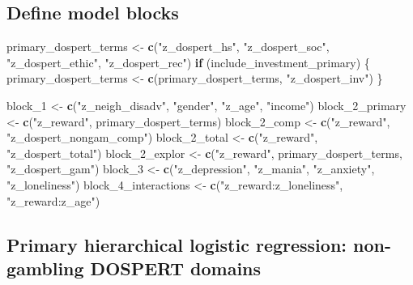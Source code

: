 \documentclass[
]{article}
\newenvironment{Shaded}{\begin{snugshade}}{\end{snugshade}}
\newcommand{\ControlFlowTok}[1]{\textcolor[rgb]{0.13,0.29,0.53}{\textbf{#1}}}
\newcommand{\FunctionTok}[1]{\textcolor[rgb]{0.13,0.29,0.53}{\textbf{#1}}}
\newcommand{\NormalTok}[1]{#1}
\newcommand{\OtherTok}[1]{\textcolor[rgb]{0.56,0.35,0.01}{#1}}
\newcommand{\StringTok}[1]{\textcolor[rgb]{0.31,0.60,0.02}{#1}}
\begin{document}
\subsection{Define model blocks}\label{define-model-blocks}

\begin{Shaded}
\begin{Highlighting}[]
\NormalTok{primary\_dospert\_terms }\OtherTok{\textless{}{-}} \FunctionTok{c}\NormalTok{(}\StringTok{"z\_dospert\_hs"}\NormalTok{, }\StringTok{"z\_dospert\_soc"}\NormalTok{, }\StringTok{"z\_dospert\_ethic"}\NormalTok{, }\StringTok{"z\_dospert\_rec"}\NormalTok{)}
\ControlFlowTok{if}\NormalTok{ (include\_investment\_primary) \{}
\NormalTok{  primary\_dospert\_terms }\OtherTok{\textless{}{-}} \FunctionTok{c}\NormalTok{(primary\_dospert\_terms, }\StringTok{"z\_dospert\_inv"}\NormalTok{)}
\NormalTok{\}}

\NormalTok{block\_1 }\OtherTok{\textless{}{-}} \FunctionTok{c}\NormalTok{(}\StringTok{"z\_neigh\_disadv"}\NormalTok{, }\StringTok{"gender"}\NormalTok{, }\StringTok{"z\_age"}\NormalTok{, }\StringTok{"income"}\NormalTok{)}
\NormalTok{block\_2\_primary }\OtherTok{\textless{}{-}} \FunctionTok{c}\NormalTok{(}\StringTok{"z\_reward"}\NormalTok{, primary\_dospert\_terms)}
\NormalTok{block\_2\_comp    }\OtherTok{\textless{}{-}} \FunctionTok{c}\NormalTok{(}\StringTok{"z\_reward"}\NormalTok{, }\StringTok{"z\_dospert\_nongam\_comp"}\NormalTok{)}
\NormalTok{block\_2\_total   }\OtherTok{\textless{}{-}} \FunctionTok{c}\NormalTok{(}\StringTok{"z\_reward"}\NormalTok{, }\StringTok{"z\_dospert\_total"}\NormalTok{)}
\NormalTok{block\_2\_explor  }\OtherTok{\textless{}{-}} \FunctionTok{c}\NormalTok{(}\StringTok{"z\_reward"}\NormalTok{, primary\_dospert\_terms, }\StringTok{"z\_dospert\_gam"}\NormalTok{)}
\NormalTok{block\_3 }\OtherTok{\textless{}{-}} \FunctionTok{c}\NormalTok{(}\StringTok{"z\_depression"}\NormalTok{, }\StringTok{"z\_mania"}\NormalTok{, }\StringTok{"z\_anxiety"}\NormalTok{, }\StringTok{"z\_loneliness"}\NormalTok{)}
\NormalTok{block\_4\_interactions }\OtherTok{\textless{}{-}} \FunctionTok{c}\NormalTok{(}\StringTok{"z\_reward:z\_loneliness"}\NormalTok{, }\StringTok{"z\_reward:z\_age"}\NormalTok{)}
\end{Highlighting}
\end{Shaded}

\subsection{Primary hierarchical logistic regression: non-gambling
DOSPERT
domains}\label{primary-hierarchical-logistic-regression-non-gambling-dospert-domains}
\end{document}
